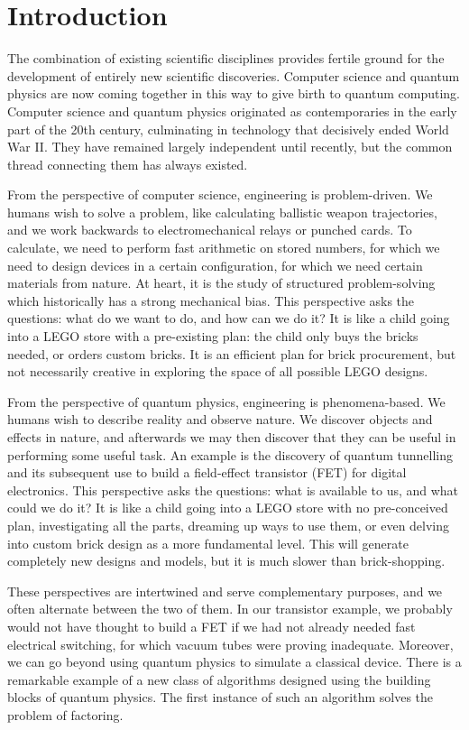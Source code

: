 \chapter{Introduction}
\label{chap:intro}

The combination of existing scientific disciplines provides fertile ground
for the development of entirely new scientific discoveries. Computer science
and quantum physics are now coming together in this way to give birth to
quantum computing. Computer science and quantum physics originated
as contemporaries in the early part of the 20th century, culminating in
technology that decisively ended World War II. They have remained
largely independent until recently, but the common thread connecting them
has always existed.

From the perspective of computer science, engineering is problem-driven.
We humans wish to solve a problem, like calculating ballistic weapon
trajectories, and we work backwards to electromechanical relays or punched
cards. To calculate,
we need to perform fast
arithmetic on stored numbers, for which we need to design devices in a
certain configuration, for which we need certain materials from nature.
At heart, it is the study of structured problem-solving which historically
has a strong
mechanical bias. This perspective asks the questions: what do we want to do,
and how can we
do it? It is like a child going into a LEGO store with a pre-existing plan:
the child only buys the bricks needed, or orders custom bricks.
It is an efficient plan for brick procurement, but not
necessarily creative in exploring the space of all possible LEGO designs.

From the perspective of quantum physics, engineering is phenomena-based.
We humans wish to describe reality and observe nature. We discover objects
and effects in nature, and afterwards we may
then discover that they
can be useful in performing some useful task. An example is
the discovery of quantum tunnelling and its subsequent use to build a
field-effect transistor (FET) for digital electronics. This perspective asks the
questions: what is available to us, and what could we do it? It is like a child
going into a LEGO store with no pre-conceived plan, investigating all the
parts, dreaming up ways to use them, or even delving into custom brick design
as a more fundamental level. This will generate completely new
designs and models, but it is much slower than brick-shopping.

These perspectives are intertwined and serve complementary purposes,
and we often alternate
between the two of them. In our transistor example, we probably would not
have thought to build a FET if we had not already needed fast electrical
switching, for which vacuum tubes were proving inadequate. Moreover, we can
go beyond using quantum physics to simulate a classical device. There is
a remarkable example
of a new class of algorithms designed using the building blocks of
quantum physics. The first instance of such an algorithm solves the problem
of factoring.


